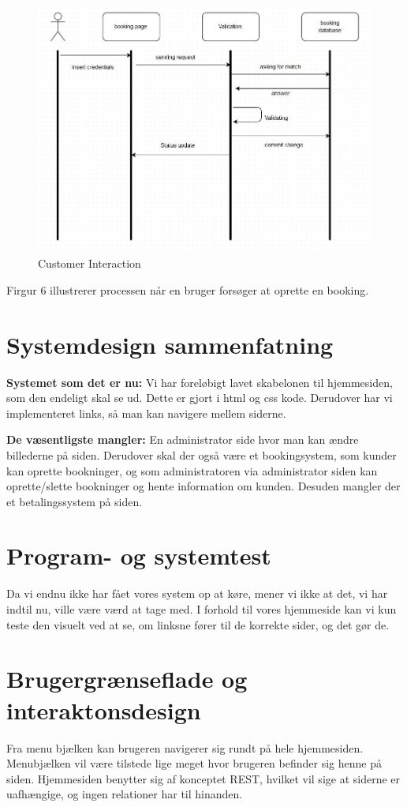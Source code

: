 \documentclass[12pt,a4paper]{article}
\begin{document}
\begin{figure}[H]
\centering
\includegraphics[scale=0.6]{customerLog-in.jpg}
\caption{Customer Interaction}
\end{figure}
Firgur 6 illustrerer processen når en bruger forsøger at oprette en booking.
\newpage
\section{Systemdesign sammenfatning}
\textbf{Systemet som det er nu:}
Vi har foreløbigt lavet skabelonen til hjemmesiden, som den endeligt skal se ud. Dette er gjort i html og css kode. Derudover har vi implementeret links, så man kan navigere mellem siderne. 

\textbf{De væsentligste mangler:}
En administrator side hvor man kan ændre billederne på siden. 
Derudover skal der også være et bookingsystem, som kunder kan oprette bookninger, og som administratoren via administrator siden kan oprette/slette bookninger og hente information om kunden. Desuden mangler der et betalingssystem på siden.

\section{Program- og systemtest}
Da vi endnu ikke har fået vores system op at køre, mener vi ikke at det, vi har indtil nu, ville være værd at tage med. I forhold til vores hjemmeside kan vi kun teste den visuelt ved at se, om linksne fører til de korrekte sider, og det gør de.

\section{Brugergrænseflade og interaktonsdesign}
Fra menu bjælken kan brugeren navigerer sig rundt på hele hjemmesiden. Menubjælken vil være tilstede lige meget hvor brugeren befinder sig henne på siden.
Hjemmesiden benytter sig af konceptet REST, hvilket vil sige at siderne er uafhængige, og ingen relationer har til hinanden.
\end{document}
